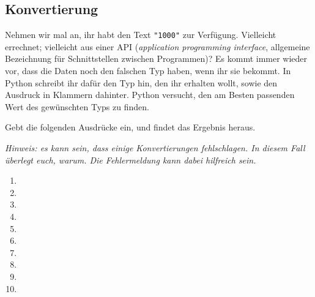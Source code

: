 \subsection{Konvertierung}

Nehmen wir mal an, ihr habt den Text \texttt{"1000"} zur Verfügung. Vielleicht
errechnet; vielleicht aus einer API (\textit{application programming interface}, allgemeine Bezeichnung für Schnittstellen zwischen Programmen)? Es kommt immer wieder vor, dass die Daten noch den falschen Typ haben, wenn ihr sie bekommt. In Python schreibt ihr dafür
den Typ hin, den ihr erhalten wollt, sowie den Ausdruck in Klammern dahinter.
Python versucht, den am Besten passenden Wert des gewünschten Typs zu finden.

Gebt die folgenden Ausdrücke ein, und findet das Ergebnis heraus.

\textit{Hinweis: es kann sein, dass einige Konvertierungen fehlschlagen. In diesem Fall überlegt euch, warum. Die Fehlermeldung kann dabei hilfreich sein.}

\begin{multicols}{3}
    \begin{enumerate}
        \item {}
        \item {}
        \item {}
        \item {}
        \item {}
        \item {}
        \item {}
        \item {}
        \item {}
        \item {}
    \end{enumerate}
\end{multicols}
